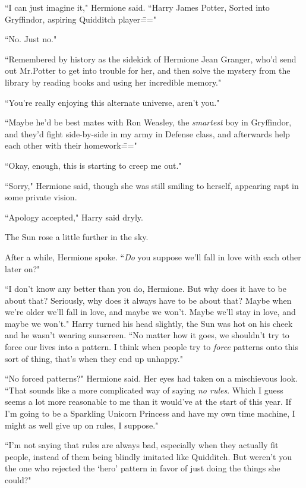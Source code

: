``I can just imagine it," Hermione said. ``Harry James Potter, Sorted into Gryffindor, aspiring Quidditch player\==="

``No. Just no."

``Remembered by history as the sidekick of Hermione Jean Granger, who'd send out Mr.\?Potter to get into trouble for her, and then solve the mystery from the library by reading books and using her incredible memory."

``You're really enjoying this alternate universe, aren't you."

``Maybe he'd be best mates with Ron Weasley, the \emph{smartest} boy in Gryffindor, and they'd fight side-by-side in my army in Defense class, and afterwards help each other with their homework\==="

``Okay, enough, this is starting to creep me out."

``Sorry," Hermione said, though she was still smiling to herself, appearing rapt in some private vision.

``Apology accepted," Harry said dryly.

The Sun rose a little further in the sky.

After a while, Hermione spoke. ``\emph{Do} you suppose we'll fall in love with each other later on?"

``I don't know any better than you do, Hermione. But why does it have to be about that? Seriously, why does it always have to be about that? Maybe when we're older we'll fall in love, and maybe we won't. Maybe we'll stay in love, and maybe we won't." Harry turned his head slightly, the Sun was hot on his cheek and he wasn't wearing sunscreen. ``No matter how it goes, we shouldn't try to force our lives into a pattern. I think when people try to \emph{force} patterns onto this sort of thing, that's when they end up unhappy."

``No forced patterns?" Hermione said. Her eyes had taken on a mischievous look. ``That sounds like a more complicated way of saying \emph{no rules}. Which I guess seems a lot more reasonable to me than it would've at the start of this year. If I'm going to be a Sparkling Unicorn Princess and have my own time machine, I might as well give up on rules, I suppose."

``I'm not saying that rules are always bad, especially when they actually fit people, instead of them being blindly imitated like Quidditch. But weren't you the one who rejected the `hero' pattern in favor of just doing the things she could?"

